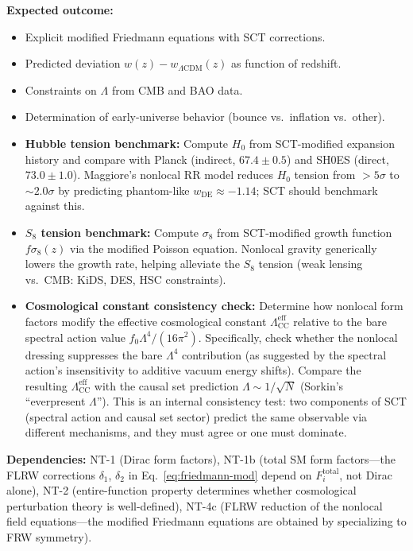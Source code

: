 \documentclass[12pt,a4paper]{article}
\newcommand{\Lam}{\Lambda}
\newcommand{\outcome}[1]{\noindent\textbf{Expected outcome:} #1\par}
\newcommand{\deps}[1]{\noindent\textbf{Dependencies:} #1\par}
\begin{document}
\outcome{
\begin{itemize}
  \item Explicit modified Friedmann equations with SCT corrections.
  \item Predicted deviation $w(z) - w_{\Lambda\text{CDM}}(z)$ as function of redshift.
  \item Constraints on $\Lam$ from CMB and BAO data.
  \item Determination of early-universe behavior (bounce vs.\ inflation vs.\ other).
  \item \textbf{Hubble tension benchmark:} Compute $H_0$ from SCT-modified
    expansion history and compare with Planck (indirect, $67.4 \pm 0.5$) and
    SH0ES (direct, $73.0 \pm 1.0$). Maggiore's nonlocal RR model reduces
    $H_0$ tension from $>5\sigma$ to ${\sim}2.0\sigma$ by predicting
    phantom-like $w_{\text{DE}} \approx -1.14$; SCT should benchmark against this.
  \item \textbf{$S_8$ tension benchmark:} Compute $\sigma_8$ from SCT-modified
    growth function $f\sigma_8(z)$ via the modified Poisson equation.
    Nonlocal gravity generically lowers the growth rate, helping alleviate
    the $S_8$ tension (weak lensing vs.\ CMB: KiDS, DES, HSC constraints).
  \item \textbf{Cosmological constant consistency check:} Determine how
    nonlocal form factors modify the effective cosmological constant
    $\Lambda_{\text{CC}}^{\text{eff}}$ relative to the bare spectral action
    value $f_0 \Lambda^4/(16\pi^2)$. Specifically, check whether the nonlocal
    dressing suppresses the bare $\Lambda^4$ contribution (as suggested by
    the spectral action's insensitivity to additive vacuum energy shifts).
    Compare the resulting $\Lambda_{\text{CC}}^{\text{eff}}$ with the causal
    set prediction $\Lambda \sim 1/\sqrt{N}$ (Sorkin's ``everpresent
    $\Lambda$''). This is an internal consistency test: two components of SCT
    (spectral action and causal set sector) predict the same observable via
    different mechanisms, and they must agree or one must dominate.
\end{itemize}
}

\deps{NT-1 (Dirac form factors), NT-1b (total SM form factors---the FLRW
corrections $\delta_1$, $\delta_2$ in Eq.~\eqref{eq:friedmann-mod} depend on
$F_i^{\text{total}}$, not Dirac alone),
NT-2 (entire-function property determines whether cosmological
perturbation theory is well-defined),
NT-4c (FLRW reduction of the nonlocal field equations---the modified
Friedmann equations are obtained by specializing to FRW symmetry).}
\end{document}
